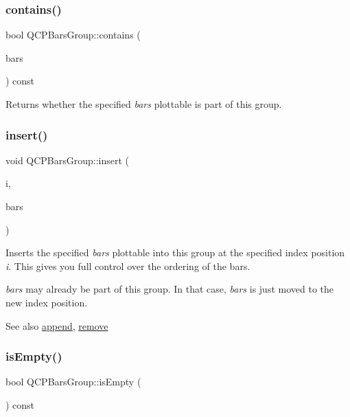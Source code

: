 \subsubsection{\texorpdfstring{contains()}{contains()}}
{\footnotesize\ttfamily bool Q\+C\+P\+Bars\+Group\+::contains (\begin{DoxyParamCaption}\item[{\hyperlink{class_q_c_p_bars}{Q\+C\+P\+Bars} $\ast$}]{bars }\end{DoxyParamCaption}) const\hspace{0.3cm}{\ttfamily [inline]}}

Returns whether the specified {\itshape bars} plottable is part of this group. \mbox{\label{class_q_c_p_bars_group_a309a5f7233db189f3ea9c2d04ece6c13}} 
\subsubsection{\texorpdfstring{insert()}{insert()}}
{\footnotesize\ttfamily void Q\+C\+P\+Bars\+Group\+::insert (\begin{DoxyParamCaption}\item[{int}]{i,  }\item[{\hyperlink{class_q_c_p_bars}{Q\+C\+P\+Bars} $\ast$}]{bars }\end{DoxyParamCaption})}

Inserts the specified {\itshape bars} plottable into this group at the specified index position {\itshape i}. This gives you full control over the ordering of the bars.

{\itshape bars} may already be part of this group. In that case, {\itshape bars} is just moved to the new index position.

\begin{DoxySeeAlso}{See also}
\hyperlink{class_q_c_p_bars_group_a809ed63cc4ff7cd5b0b8c96b470163d3}{append}, \hyperlink{class_q_c_p_bars_group_a215e28a5944f1159013a0e19169220e7}{remove} 
\end{DoxySeeAlso}
\mbox{\label{class_q_c_p_bars_group_aac959e79e852e8ef9aea6e0449ad000a}} 
\subsubsection{\texorpdfstring{is\+Empty()}{isEmpty()}}
{\footnotesize\ttfamily bool Q\+C\+P\+Bars\+Group\+::is\+Empty (\begin{DoxyParamCaption}{ }\end{DoxyParamCaption}) const\hspace{0.3cm}{\ttfamily [inline]}}

